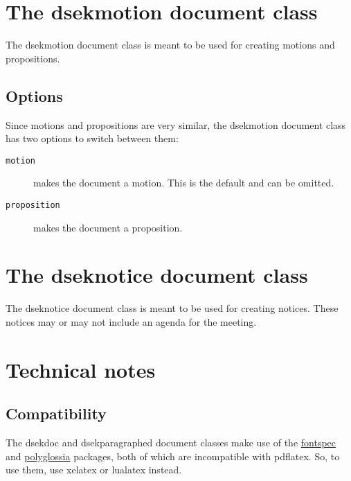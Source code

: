 \documentclass[a4paper, oneside]{ltxdoc}
\begin{document}
\section{The \textsf{dsekmotion} document class}
The \textsf{dsekmotion} document class is meant to be used for creating
motions and propositions.

\subsection{Options}
Since motions and propositions are very similar, the \textsf{dsekmotion}
document class has two options to switch between them:
\begin{description}
  \item[\texttt{motion}] makes the document a motion. This is the default and
    can be omitted.
  \item[\texttt{proposition}] makes the document a proposition.
\end{description}

\section{The \textsf{dseknotice} document class}
The \textsf{dseknotice} document class is meant to be used for creating notices.
These notices may or may not include an agenda for the meeting.

\section{Technical notes}

\subsection{Compatibility}

The \textsf{dsekdoc} and \textsf{dsekparagraphed} document classes make use of
the \href{https://ctan.org/pkg/fontspec}{\textsf{fontspec}} and
\href{https://ctan.org/pkg/polyglossia}{\textsf{polyglossia}} packages, both of
which are incompatible with \textsf{pdflatex}.  So, to use them, use
\textsf{xelatex} or \textsf{lualatex} instead.
\end{document}

